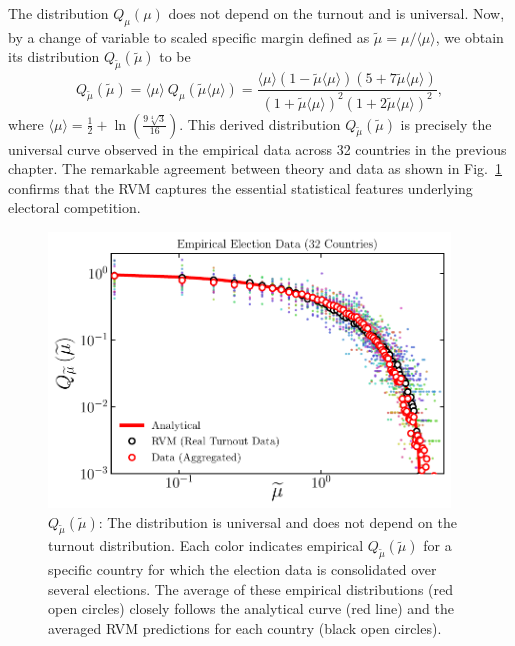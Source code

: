 The distribution $Q_{\mu}\left(\mu\right)$ does not depend on the turnout and is universal. Now, by a change of variable to scaled specific margin defined as $\widetilde{\mu} = \mu / \langle \mu \rangle$, we obtain its distribution $Q_{\widetilde{\mu}}\left(\widetilde{\mu}\right)$ to be
\begin{equation}
    Q_{\widetilde{\mu}}\left(\widetilde{\mu}\right) = \langle \mu \rangle ~ Q_{\mu}\left( \widetilde{\mu} \langle \mu \rangle \right) =  \frac{\langle \mu \rangle(1 - \widetilde{\mu} \langle \mu \rangle)(5 + 7\widetilde{\mu} \langle \mu \rangle)}{(1 + \widetilde{\mu} \langle \mu \rangle)^2(1 + 2\widetilde{\mu} \langle \mu \rangle)^2}, 
\end{equation}
where $\langle \mu\rangle = \frac{1}{2}+\ln \left(\frac{9 \sqrt[4]{3}}{16}\right)$.
This derived distribution $Q_{\widetilde{\mu}}\left(\widetilde{\mu}\right)$ is precisely the universal curve observed in the empirical data across 32 countries in the previous chapter. The remarkable agreement between theory and data as shown in Fig.~\ref{fig:RVM_mu} confirms that the RVM captures the essential statistical features underlying electoral competition.

\begin{figure}[H]
    \centering
    \includegraphics[width=0.95\textwidth]{chapters/chapter5/universality_empirical_analytical.pdf}
    \caption{$Q_{\widetilde{\mu}}\left(\widetilde{\mu}\right)$: The distribution is universal and does not depend on the turnout distribution. Each color indicates empirical $Q_{\widetilde{\mu}}\left(\widetilde{\mu}\right)$ for a specific country for which the election data is consolidated over several elections. The average of these empirical distributions (red open circles) closely follows the analytical curve (red line) and the averaged RVM predictions for each country (black open circles).}
    \label{fig:RVM_mu}
\end{figure}

